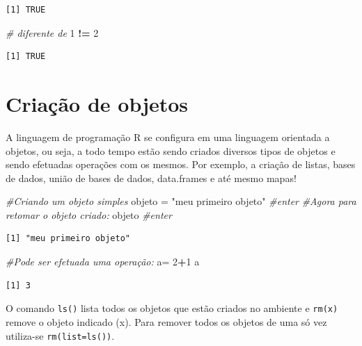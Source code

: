 \documentclass[12pt,brazil,oneside]{book}
\newenvironment{Shaded}{\begin{snugshade}}{\end{snugshade}}
\newcommand{\CommentTok}[1]{\textcolor[rgb]{0.56,0.35,0.01}{\textit{#1}}}
\newcommand{\DecValTok}[1]{\textcolor[rgb]{0.00,0.00,0.81}{#1}}
\newcommand{\NormalTok}[1]{#1}
\newcommand{\OperatorTok}[1]{\textcolor[rgb]{0.81,0.36,0.00}{\textbf{#1}}}
\newcommand{\StringTok}[1]{\textcolor[rgb]{0.31,0.60,0.02}{#1}}
\begin{document}
\begin{verbatim}
[1] TRUE
\end{verbatim}

\begin{Shaded}
\begin{Highlighting}[]
\CommentTok{# diferente de}
\DecValTok{1} \OperatorTok{!=}\StringTok{ }\DecValTok{2}
\end{Highlighting}
\end{Shaded}

\begin{verbatim}
[1] TRUE
\end{verbatim}

\hypertarget{criacao-de-objetos}{%
\section{Criação de objetos}\label{criacao-de-objetos}}

A linguagem de programação R se configura em uma linguagem orientada a objetos, ou seja, a todo tempo estão sendo criados diversos tipos de objetos e sendo efetuadas operações com os mesmos. Por exemplo, a criação de listas, bases de dados, união de bases de dados, data.frames e até mesmo mapas!

\begin{Shaded}
\begin{Highlighting}[]
\CommentTok{#Criando um objeto simples}
\NormalTok{objeto =}\StringTok{ "meu primeiro objeto"} \CommentTok{#enter}
\CommentTok{#Agora para retomar o objeto criado:}
\NormalTok{objeto }\CommentTok{#enter}
\end{Highlighting}
\end{Shaded}

\begin{verbatim}
[1] "meu primeiro objeto"
\end{verbatim}

\begin{Shaded}
\begin{Highlighting}[]
\CommentTok{#Pode ser efetuada uma operação:}
\NormalTok{a=}\StringTok{ }\DecValTok{2}\OperatorTok{+}\DecValTok{1}
\NormalTok{a}
\end{Highlighting}
\end{Shaded}

\begin{verbatim}
[1] 3
\end{verbatim}

O comando \texttt{ls()} lista todos os objetos que estão criados no ambiente e \texttt{rm(x)} remove o objeto indicado (x). Para remover todos os objetos de uma só vez utiliza-se \texttt{rm(list=ls())}.
\end{document}
